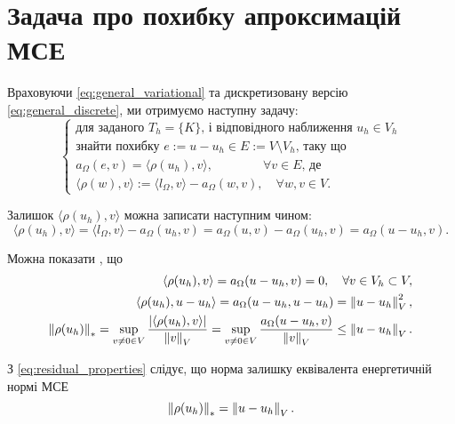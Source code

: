 
\section{Задача про похибку апроксимацій МСЕ}

Враховуючи
\eqref{eq:general_variational} та дискретизовану версію
\eqref{eq:general_discrete}, ми отримуємо наступну задачу:
%
\begin{equation}\label{eq:AE_problem}
	\begin{cases}
		\mbox{для заданого } T_h=\{K\} \text{, і відповідного наближення } u_h \in V_h \\
		\text{знайти похибку } e:=u-u_h \in E := V \setminus V_h \text{, таку що} \\
		a_\Omega(e,v) = \langle\rho(u_h), v\rangle, \qquad \qquad \forall v \in E \text{, де}\\
		\langle\rho(w), v\rangle := \langle l_\Omega, v\rangle - a_\Omega(w, v), \quad \forall w,v \in V.
	\end{cases}
\end{equation}

Залишок $\langle\rho(u_h), v\rangle$ можна записати наступним чином:
\begin{equation*}
	\langle\rho(u_h), v\rangle
		= \langle l_\Omega, v\rangle - a_\Omega(u_h, v)
		= a_\Omega(u,v)-a_\Omega(u_h, v) = a_\Omega(u-u_h, v).
\end{equation*}

Можна показати \cite{kvasnyca2002}, що
%
\begin{equation}\label{eq:residual_properties}
	\begin{split}
		\langle\rho(u_h), v\rangle = a_\Omega(u-u_h, v) = 0, \quad \forall v \in V_h \subset V,\\
		\langle\rho(u_h), u-u_h\rangle = a_\Omega(u-u_h, u-u_h) = \left\lVert u-u_h\right\rVert^2_V,\\
		\left\lVert\rho(u_h)\right\rVert_* = \sup \limits_{v \ne 0 \in V} \frac{|\langle\rho(u_h), v\rangle|}{\left\lVert v\right\rVert_V} =
			\sup \limits_{v \ne 0 \in V} \frac{a_\Omega(u-u_h, v)}{\left\lVert v\right\rVert_V} \le \left\lVert u-u_h\right\rVert_V .
	\end{split}
\end{equation}

З
\eqref{eq:residual_properties} слідує, що норма залишку еквівалента енергетичній нормі МСЕ
\begin{equation}
	\left\lVert\rho(u_h)\right\rVert_* = \left\lVert u-u_h\right\rVert_V.
\end{equation}


